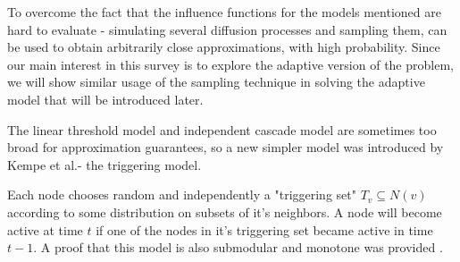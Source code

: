 To overcome the fact that the influence functions for the models mentioned are hard to evaluate - simulating several diffusion processes and sampling them, can be used to obtain arbitrarily close approximations, with high probability. Since our main interest in this survey is to explore the adaptive version of the problem, we will show similar usage of the sampling technique in solving the adaptive model that will be introduced later.


The linear threshold model and independent cascade model are sometimes too broad for approximation guarantees, so a new simpler model was introduced by Kempe et al.- the triggering model.
\begin{definition}
 Each node chooses random and independently a "triggering set" $T_v\subseteq N(v)$ according to some distribution on subsets of it's neighbors. A node will become active at time $t$ if one of the nodes in it's triggering set became active in time $t-1$. A proof that this model is also submodular and monotone was provided \cite{kempe2003maximizing}.
\end{definition}

